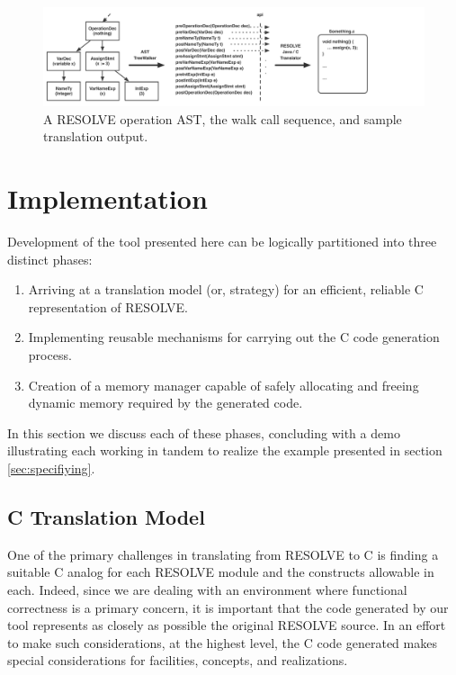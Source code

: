 \documentclass{sig-alternate}
\begin{document}
\begin{figure}
\centering
\includegraphics[scale=.55]{figs/ast_traversal.pdf}
\caption{A RESOLVE operation AST, the walk call sequence, and sample translation output.}
\end{figure}
\label{fig:ast}

\section{Implementation}
Development of the tool presented here can be logically partitioned into three distinct phases: 
\begin{enumerate}
\item Arriving at a translation model (or, strategy) for an efficient, reliable C representation of RESOLVE.
\item Implementing reusable mechanisms for carrying out the C code generation process.
\item Creation of a memory manager capable of safely allocating and freeing dynamic memory required by the generated code.
\end{enumerate}
In this section we discuss each of these phases, concluding with a demo illustrating each working in tandem to realize the example presented in section \ref{sec:specifiying}.

\subsection{C Translation Model}
One of the primary challenges in translating from RESOLVE to C is finding a suitable C analog for each RESOLVE module and the constructs allowable in each. Indeed, since we are dealing with an environment where functional correctness is a primary concern, it is important that the code generated by our tool represents as closely as possible the original RESOLVE source. In an effort to make such considerations, at the highest level, the C code generated makes special considerations for facilities, concepts, and realizations.
\end{document}
